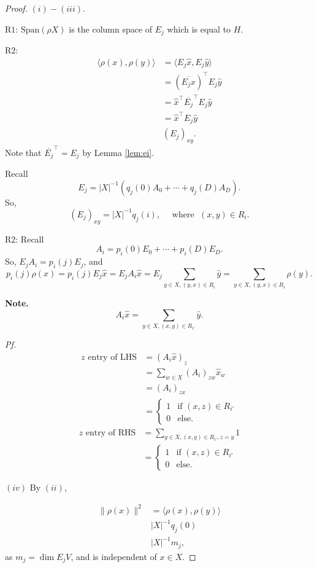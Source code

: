 \documentclass[
]{book}
\theoremstyle{definition}
\theoremstyle{definition}
\theoremstyle{definition}
\theoremstyle{definition}
\theoremstyle{remark}
\begin{document}
\begin{proof}
\leavevmode

\((i)-(iii)\).

\(\mathrm{R1}\): \(\mathrm{Span}(\rho X)\) is the column space of \(E_j\) which is equal to \(H\).

\(\mathrm{R2}\):
\begin{align}
\langle \rho(x),\rho(y)\rangle & = \langle E_j\hat{x}, E_j\hat{y}\rangle \\
& = (\overline{E_j\hat{x}})^\top E_j\hat{y}\\
& = \hat{x}^\top \overline{E_j}^\top E_j\hat{y}\\
& = \hat{x}^\top E_j \hat{y}\\
& (E_j)_{xy}.
\end{align}
Note that \(\overline{E_j}^\top = E_j\) by Lemma \ref{lem:ei}.

Recall
\[E_j = |X|^{-1}(q_j(0)A_0 + \cdots + q_j(D)A_D).\]
So,
\[(E_j)_{xy} = |X|^{-1}q_j(i), \quad \text{ where } \; (x,y)\in R_i.\]

\(\mathrm{R2}\): Recall
\[A_i = p_i(0)E_0 + \cdots + p_i(D)E_D.\]
So,
\(E_jA_i = p_i(j)E_j\), and
\[p_i(j)\rho(x) = p_i(j)E_j\hat{x} = E_jA_i\hat{x} = E_j\sum_{y\in X, (y,x)\in R_i}\hat{y} = \sum_{y\in X, (y,x)\in R_i}\rho(y).\]

\textbf{Note.}
\[A_i\hat{x} = \sum_{y\in X, (x,y)\in R_{i'}}\hat{y}.\]

\emph{Pf.}
\begin{align}
\text{$z$ entry of LHS} & = (A_i\hat{x})_z \\
& = \sum_{w\in X}(A_i)_{zw}\hat{x}_w\\
& = (A_i)_{zx}\\
& = \begin{cases}
1 & \text{if $(x,z)\in R_{i'}$}\\
0 & \text{else}.
\end{cases}
\end{align}
\begin{align}
\text{$z$ entry of RHS} & = \sum_{y\in X, (x,y)\in R_{i'}, z = y}1\\
& = \begin{cases}
1 & \text{if $(x,z)\in R_{i'}$}\\
0 & \text{else}.
\end{cases}
\end{align}

\((iv)\) By \((ii)\),

\begin{align}
\|\rho(x)\|^2 & = \langle \rho(x), \rho(y)\rangle\\
& |X|^{-1}q_j(0)\\
& |X|^{-1}m_j,
\end{align}
as \(m_j = \dim E_jV\), and is independent of \(x\in X\).


\end{proof}
\end{document}

